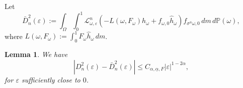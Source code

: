 \documentclass[12pt,reqno,a4paper]{article}
\newtheorem{lemma}[theorem]{Lemma}
\begin{document}
Let
\[
\bar D_n^2(\varepsilon):=\int_\Omega \int_0^1\mathcal L_{\omega, \varepsilon}^n(-L(\omega, F_\omega)h_\omega+f_{\omega,0}\hat h_\omega)f_{\sigma^n \omega, 0}\, dm\, d\mathbb P(\omega),
\]
where $L(\omega, F_\omega):=\int_0^1 F_\omega \hat h_\omega\, dm$.
\begin{lemma}\label{837n}
	We have
	\[
	|D_n^2(\varepsilon)-\bar D_n^2(\varepsilon)|\le C_{\alpha, \underline{\alpha}, F}|\varepsilon|^{1-2\alpha},
	\]
	for $\varepsilon$ sufficiently close to $0$.
\end{lemma}
\end{document}
